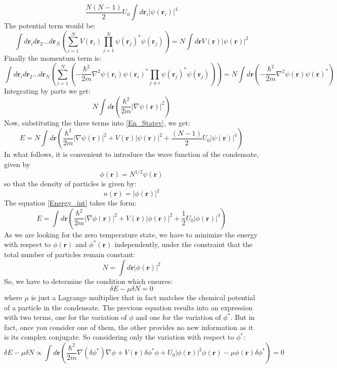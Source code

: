 \documentclass{article}
\begin{document}
$$
 \frac{N(N-1)}{2}U_0\int d\mathbf{r}_i |\psi(\mathbf{r}_i)|^4
$$
The potential term would be:
$$
 \int d\mathbf{r}_i d\mathbf{r}_2 ... d\mathbf{r}_N\left(\sum_{i=1}^{N}V(\mathbf{r}_i)\prod_{j=1}^{N}\psi(\mathbf{r}_j)^{*}\psi(\mathbf{r}_j)\right)=N\int d\mathbf{r} V(\mathbf{r})|\psi(\mathbf{r})|^2
$$
Finally the momentum term is:
$$
 \int d\mathbf{r}_i d\mathbf{r}_2 ... d\mathbf{r}_N \left(\sum_{i=1}^{N}\left(-\frac{\hbar^2}{2m}\nabla^2\psi(\mathbf{r}_i)\psi(\mathbf{r}_i)^{*}\prod_{j\neq i}\psi(\mathbf{r}_j)^{*}\psi(\mathbf{r}_j)\right)\right)=N\int d\mathbf{r} \left(-\frac{\hbar^2}{2m}\nabla^2\psi(\mathbf{r})\psi(\mathbf{r})^{*}\right)
$$
Integrating by parts we get:
$$
 N\int d\mathbf{r} \left(\frac{\hbar^2}{2m}|\nabla\psi(\mathbf{r})|^2\right)
$$
Now, substituting the three terms into \eqref{En_Statev}, we get:
\begin{equation}\label{Energy_int}
 E=N\int d\mathbf{r}\left(\frac{\hbar^2}{2m}|\nabla\psi(\mathbf{r})|^2+V(\mathbf{r})|\psi(\mathbf{r})|^2+\frac{(N-1)}{2}U_0|\psi(\mathbf{r})|^4\right)
\end{equation}
In what follows, it is convenient to introduce the wave function of the condensate, given by 
$$
 \phi(\mathbf{r})=N^{1/2}\psi(\mathbf{r})
$$
so that the density of particles is given by:
$$
 n(\mathbf{r})=|\phi(\mathbf{r})|^2
$$
The equation \ref{Energy_int} takes the form:
\begin{equation}\label{Energy_cond_wave_f}
 E=\int d\mathbf{r}\left(\frac{\hbar^2}{2m}|\nabla\phi(\mathbf{r})|^2+V(\mathbf{r})|\phi(\mathbf{r})|^2+\frac{1}{2}U_0|\phi(\mathbf{r})|^4\right)
\end{equation}
As we are looking for the zero temperature state, we have to minimize the energy with respect to $\phi(\mathbf{r})$ and $\phi^{*}(\mathbf{r})$ independently, under the constraint that the total number of particles remain constant: 
$$
 N=\int d\mathbf{r}|\phi(\mathbf{r})|^2
$$
So, we have to determine the condition which ensures:
$$
 \delta E- \mu \delta N=0
$$
where $\mu$ is just a Lagrange multiplier that in fact matches the chemical potential of a particle in the condensate. The previous equation results into an expression with two terms, one for the variation of $\phi$ and one for the variation of $\phi^*$. But in fact, once you consider one of them, the other provides no new information as it is its complex conjugate. So considering only the variation with respect to $\phi^*$:
$$
 \delta E-\mu \delta N \propto \int d\mathbf{r} \left(\frac{\hbar^2}{2m}\nabla( \delta \phi^*)\nabla \phi +V(\mathbf{r})\delta \phi^* \phi +U_0 |\phi(\mathbf{r})|^2 \phi(\mathbf{r})-\mu \phi(\mathbf{r}) \delta \phi^*\right)=0
$$
\end{document}
